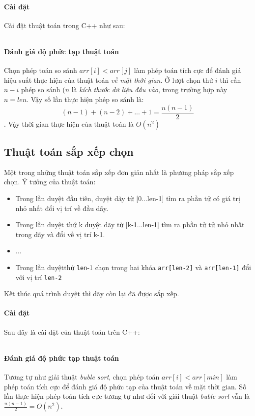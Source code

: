 \documentclass[8pt, a4paper]{article}
\newcommand{\mnt}[1]{\inputminted[frame=single, linenos=true, tabsize=4]{c++}{#1}}
\begin{document}
\paragraph{Cài đặt}
Cài đặt thuật toán trong C++ như sau:
\mnt{src/bublesort.cpp}

\paragraph{Đánh giá độ phức tạp thuật toán}
Chọn phép toán so sánh $arr[i] < arr[j]$ làm phép toán tích cực để đánh giá hiệu suất thực hiện của thuật toán \emph{về mặt thời gian}. Ở lượt chọn thứ $i$ thì cần $n-i$ phép so sánh ($n$ là \emph{kích thước dữ liệu đầu vào}, trong trường hợp này $n = len$. Vậy số lần thực hiện phép so sánh là:
$$(n-1) + (n-2) + ... + 1 = \frac{n(n-1)}{2}$$. Vậy thời gian thực hiện của thuật toán là $O(n^2)$





\subsection{Thuật toán sắp xếp chọn}

Một trong những thuật toán sắp xếp đơn giản nhất là phương pháp sắp xếp chọn. Ý tưởng của thuật toán:
\begin{itemize}
\item Trong lần duyệt đầu tiên, duyệt dãy từ [0...len-1] tìm ra phần tử có giá trị nhỏ nhất đổi vị trí về đầu dãy.
\item Trong lần duyệt thứ k duyệt dãy từ [k-1...len-1] tìm ra phần tử tử nhỏ nhất trong dãy và đổi về vị trí k-1.
\item ...
\item Trong lần duyệtthứ \texttt{len}-1 chọn trong hai khóa \texttt{arr[len-2]} và \texttt{arr[len-1]} đổi với vị trí \texttt{len-2}
\end{itemize}

Kết thúc quá trình duyệt thì dãy còn lại đã được sắp xếp.

\paragraph{Cài đặt}
Sau đây là cài đặt của thuật toán trên C++:
\mnt{src/selectionsort.cpp}

\paragraph{Đánh giá độ phức tạp thuật toán}
Tương tự như giải thuật \emph{buble sort}, chọn phép toán $arr[i] < arr[min]$ làm phép toán tích cực để đánh giá độ phức tạp của thuật toán về mặt thời gian. Số lần thực hiện phép toán tích cực tương tự như đối với giải thuật \emph{buble sort} vẫn là $\frac{n(n-1)}{2} = O(n^2)$.
\end{document}

